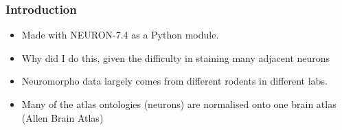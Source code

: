 \documentclass{beamer}
\begin{document}
\begin{frame}
\frametitle{Introduction}%
\begin{itemize}
\vfill \item Made with NEURON-7.4 as a Python module. 	

\vfill \item Why did I do this, given the difficulty in staining many adjacent neurons
\vfill \item Neuromorpho data largely comes from different rodents in different labs.
\vfill \item Many of the atlas ontologies (neurons) are normalised onto one brain atlas (Allen Brain Atlas)



\end{itemize}
\end{frame}
\end{document}
